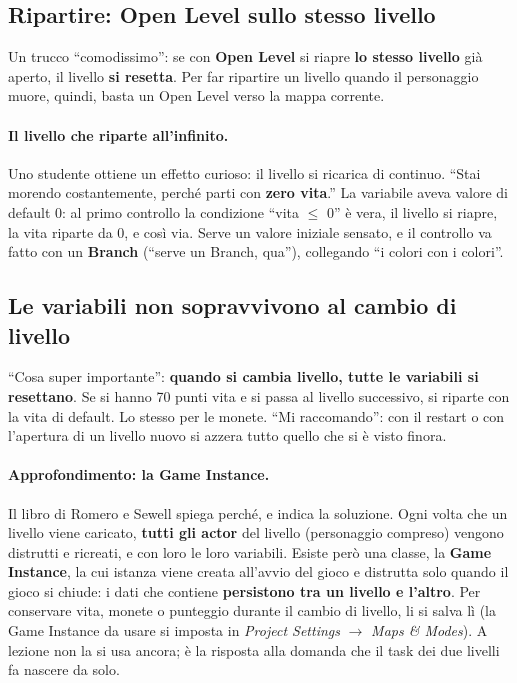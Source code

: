 \subsection{Ripartire: Open Level sullo stesso livello}

Un trucco ``comodissimo'': se con \textbf{Open Level} si riapre \textbf{lo
stesso livello} già aperto, il livello \textbf{si resetta}. Per far ripartire
un livello quando il personaggio muore, quindi, basta un Open Level verso la
mappa corrente.

\paragraph{Il livello che riparte all'infinito.} Uno studente ottiene un
effetto curioso: il livello si ricarica di continuo. ``Stai morendo
costantemente, perché parti con \textbf{zero vita}.'' La variabile aveva
valore di default 0: al primo controllo la condizione ``vita $\le$ 0'' è
vera, il livello si riapre, la vita riparte da 0, e così via. Serve un valore
iniziale sensato, e il controllo va fatto con un \textbf{Branch} (``serve un
Branch, qua''), collegando ``i colori con i colori''.

\subsection{Le variabili non sopravvivono al cambio di livello}

``Cosa super importante'': \textbf{quando si cambia livello, tutte le
variabili si resettano}. Se si hanno 70 punti vita e si passa al livello
successivo, si riparte con la vita di default. Lo stesso per le monete. ``Mi
raccomando'': con il restart o con l'apertura di un livello nuovo si azzera
tutto quello che si è visto finora.

\paragraph{Approfondimento: la Game Instance.} Il libro di Romero e Sewell
spiega perché, e indica la soluzione. Ogni volta che un livello viene
caricato, \textbf{tutti gli actor} del livello (personaggio compreso) vengono
distrutti e ricreati, e con loro le loro variabili. Esiste però una classe,
la \textbf{Game Instance}, la cui istanza viene creata all'avvio del gioco e
distrutta solo quando il gioco si chiude: i dati che contiene
\textbf{persistono tra un livello e l'altro}. Per conservare vita, monete o
punteggio durante il cambio di livello, li si salva lì (la Game Instance da
usare si imposta in \emph{Project Settings} $\rightarrow$ \emph{Maps \&
Modes}). A lezione non la si usa ancora; è la risposta alla domanda che il
task dei due livelli fa nascere da solo.

